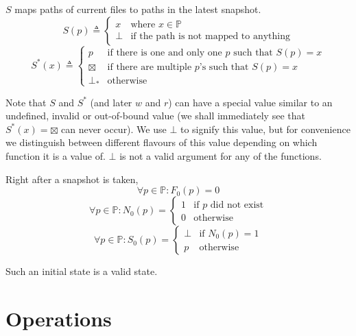\documentclass[12pt]{article}
\newcommand{\bxt}{\boxtimes}
\newcommand{\bdt}{\bot\!_*}
\newcommand{\setp}{\mathbb{P}}
\begin{document}
$S$ maps paths of current files to paths in the latest
snapshot.
$$
S(p)\triangleq\left\{ \begin{array}{ll}
x & \mbox{where } x\in\setp\\
\bot & \mbox{if the path is not mapped to anything}
\end{array}\right.
$$
$$
S^*(x)\triangleq\left\{ \begin{array}{ll}
p & \mbox{if there is one and only one $p$ such that } S(p)=x \\
\bxt & \mbox{if there are multiple $p$'s such that } S(p)=x \\
\bdt & \mbox{otherwise}
\end{array}\right.
$$

Note that $S$ and $S^*$ (and later $w$ and $r$) can have a special value
similar to an undefined, invalid or out-of-bound value
(we shall immediately see that $S^*(x)=\bxt$ can never occur).
We use $\bot$ to signify this value, but for convenience we distinguish
between different flavours of this value depending on which function it is a value of.
$\bot$ is not a valid argument for any of the functions.

Right after a snapshot is taken,
\begin{equation}
\forall p\in\setp: F_0(p)=0
\end{equation}
\begin{equation}
\forall p\in\setp:N_0(p)=\left\{ \begin{array}{rl}
1 & \mbox{if $p$ did not exist} \\
0 & \mbox{otherwise}
\end{array}\right.
\end{equation}
\begin{equation}
\forall p\in\setp:S_0(p)=\left\{ \begin{array}{rl}
\bot & \mbox{if } N_0(p)=1 \\
p & \mbox{otherwise}
\end{array}\right.
\end{equation}

Such an initial state is a valid state.

\section{Operations}
\end{document}
